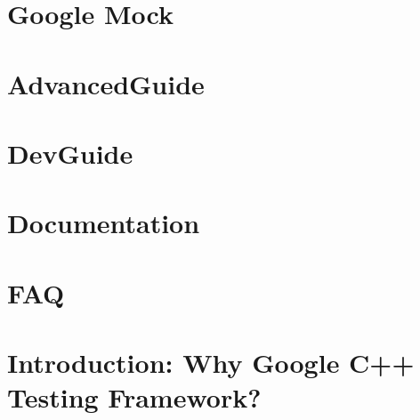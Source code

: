 \documentclass[twoside]{book}
\newcommand{\+}{\discretionary{\mbox{\scriptsize$\hookleftarrow$}}{}{}}
\begin{document}
\chapter{Google Mock}
\label{md_smacc_sm_reference_library_sm_panda_moveit_libfranka_3rdparty_googletest_googlemock_README}

\chapter{Advanced\+Guide}
\label{md_smacc_sm_reference_library_sm_panda_moveit_libfranka_3rdparty_googletest_googletest_docs_AdvancedGuide}

\chapter{Dev\+Guide}
\label{md_smacc_sm_reference_library_sm_panda_moveit_libfranka_3rdparty_googletest_googletest_docs_DevGuide}

\chapter{Documentation}
\label{md_smacc_sm_reference_library_sm_panda_moveit_libfranka_3rdparty_googletest_googletest_docs_Documentation}

\chapter{F\+AQ}
\label{md_smacc_sm_reference_library_sm_panda_moveit_libfranka_3rdparty_googletest_googletest_docs_FAQ}

\chapter{Introduction\+: Why Google C++ Testing Framework?}
\label{md_smacc_sm_reference_library_sm_panda_moveit_libfranka_3rdparty_googletest_googletest_docs_Primer}

\end{document}
